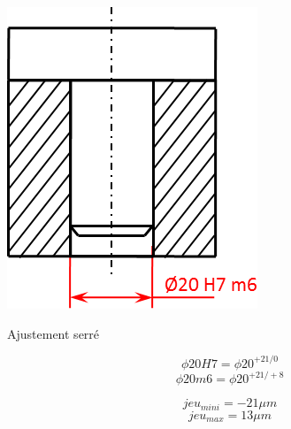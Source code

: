 \documentclass[11pt,oneside]{article}
\begin{document}
\begin{exemple}
\begin{minipage}[c]{.3\linewidth}
\begin{center}
\includegraphics[width=.9\textwidth]{png/serre}

Ajustement serré
\end{center}

$$\phi 20 H7 = \phi 20^{+21/0} $$
$$ \phi 20 m6 = \phi 20^{+21/+8}$$

$$jeu_{mini}= -21\mu m $$
$$jeu_{max}=13\mu m$$


\end{minipage}
\end{exemple}
\end{document}
